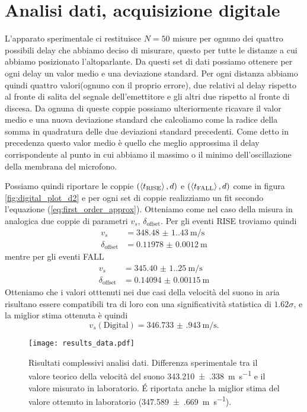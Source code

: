 \documentclass[
    rmp,
    reprint, 
    superscriptaddress, 
    altaffilletter, 
    amsmath, 
    amssymb, 
    a4paper,
    varvw]{revtex4-2}
\begin{document}
\section{Analisi dati, acquisizione digitale}

L'apparato sperimentale ci restituisce $N=50$ misure per ognuno dei quattro possibili delay che abbiamo deciso di misurare, questo per tutte le distanze a cui abbiamo posizionato l'altoparlante. Da questi set di dati possiamo ottenere per ogni delay un valor medio e una deviazione standard. Per ogni distanza abbiamo quindi quattro valori(ognuno con il proprio errore), due relativi al delay rispetto al fronte di salita del segnale dell'emettitore e gli altri due rispetto al fronte di discesa. Da ognuna di queste coppie possiamo ulteriormente ricavare il valor medio e una nuova deviazione standard che calcoliamo come la radice della somma in quadratura delle due deviazioni standard precedenti. Come detto in precedenza questo valor medio è quello che meglio approssima il delay corrispondente al punto in cui abbiamo il massimo o il minimo dell'oscillazione della membrana del microfono. 

Possiamo quindi riportare le coppie $(\expval{t_\text{RISE}}, d)$ e $(\expval{t_\text{FALL}}, d)$ come in figura \ref{fig:digital_plot_d2} e per ogni set di coppie realizziamo un fit secondo l'equazione (\ref{eq:first_order_approx}). Otteniamo come nel caso della misura in analogica due coppie di parametri $v_s$, $\delta_\text{offset}$.
Per gli eventi RISE troviamo quindi
\begin{align*}
    v_s &= \SI{348.48(1.43)}{\metre\per\second} \\
    \delta_\text{offset} &= \SI{0.11978(120)}{\metre}
\end{align*}
mentre per gli eventi FALL
\begin{align*}
    v_s &= \SI{345.40(1.25)}{\metre\per\second} \\
    \delta_\text{offset} &= \SI{0.14094(115)}{\metre}
\end{align*}
Otteniamo che i valori otttenuti nei due casi della velocità del suono in aria risultano essere compatibili tra di loro con una significatività statistica di $1.62\sigma$, e la miglior stima ottenuta è quindi \[v_s(\text{Digital}) = \SI{346.733(943)}{\metre\per\second}.\]


\begin{figure}
    \centering
    \texttt{[image: results\_data.pdf]}
    \caption{Risultati complessivi analisi dati. Differenza sperimentale tra il valore teorico della velocità del suono \SI{343.210(338)}{\metre\per\second} e il valore misurato in laboratorio. \'E riportata anche la miglior stima del valore ottenuto in laboratorio (\SI{347.589(669)}{\metre\per\second}).}\label{fig:results}
\end{figure}
\end{document}
